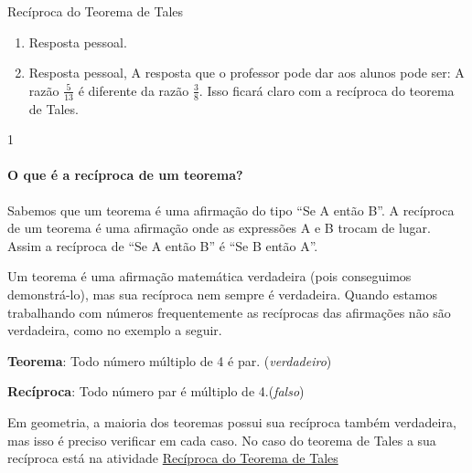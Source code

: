 \begin{answer}{Recíproca do Teorema de Tales}
{
\begin{enumerate}
\item {} 
Resposta pessoal.

\item {} 
Resposta pessoal, A resposta que o professor pode dar aos alunos pode ser: A razão \(\frac{5}{13}\) é diferente da razão \(\frac{3}{8}\). Isso ficará claro com a recíproca do teorema de Tales.

\end{enumerate}
}{1}
\end{answer}


\def\currentcolor{session4}

\paragraph{O que é a recíproca de um teorema?}

Sabemos que um teorema é uma afirmação do tipo “Se A então B”. A recíproca de um teorema é uma afirmação onde as expressões A e B trocam de lugar. Assim a recíproca de “Se A então B” é “Se B então A”.

Um teorema é uma afirmação matemática verdadeira (pois conseguimos demonstrá-lo), mas sua recíproca nem sempre é verdadeira. Quando estamos trabalhando com números frequentemente as recíprocas das afirmações não são verdadeira, como no exemplo a seguir.

\textbf{Teorema}: Todo número múltiplo de 4 é par. (\textit{verdadeiro})

\textbf{Recíproca}: Todo número par é múltiplo de 4.(\textit{falso})

Em geometria, a maioria dos teoremas possui sua recíproca também verdadeira, mas isso é preciso verificar em cada caso. No caso do teorema de Tales a sua recíproca está  na atividade \hyperref[reciproca-tales]{Recíproca do Teorema de Tales}


\know{}

